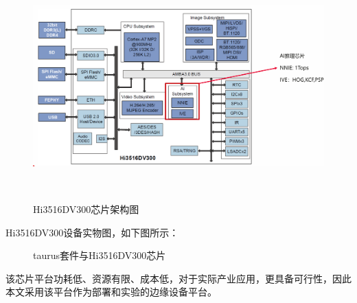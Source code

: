 \begin{figure}[H]
    \includegraphics[width=14cm, height=8cm]{pic/Hi3516DV300-architect.png}      
    \label{hi3516dv300-architect}
    \caption{Hi3516DV300芯片架构图}
\end{figure}

Hi3516DV300设备实物图，如下图所示：
\begin{figure}[H]
    \caption{taurus套件与Hi3516DV300芯片}
    \label{taurus-hi3516dv300}
\end{figure}    

该芯片平台功耗低、资源有限、成本低，对于实际产业应用，更具备可行性，因此本文采用该平台作为部署和实验的边缘设备平台。




